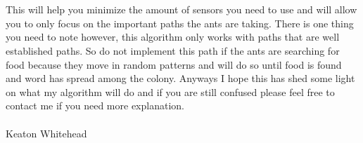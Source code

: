 \documentclass[12pt]{article}
\begin{document}
\\
\\
This will help you minimize the amount of sensors you need to use and will allow you to only focus on the important paths the ants are taking. There is one thing you need to note however, this algorithm only works with paths that are well established paths. So do not implement this path if the ants are searching for food because they move in random patterns and will do so until food is found and word has spread among the colony. Anyways I hope this has shed some light on what my algorithm will do and if you are still confused please feel free to contact me if you need more explanation. 
\\
\\
Keaton Whitehead
\mbox{}
\newpage
\pagebreak
\end{document}
